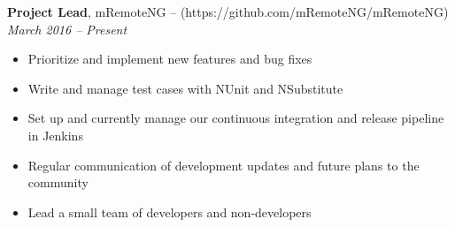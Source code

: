 {\bf Project Lead}, mRemoteNG – (https://github.com/mRemoteNG/mRemoteNG)\\
{\it March 2016 – Present}
\begin{itemize}
	\item Prioritize and implement new features and bug fixes
	\item Write and manage test cases with NUnit and NSubstitute
	\item Set up and currently manage our continuous integration and release pipeline in Jenkins
	\item Regular communication of development updates and future plans to the community
	\item Lead a small team of developers and non-developers
\end{itemize}
